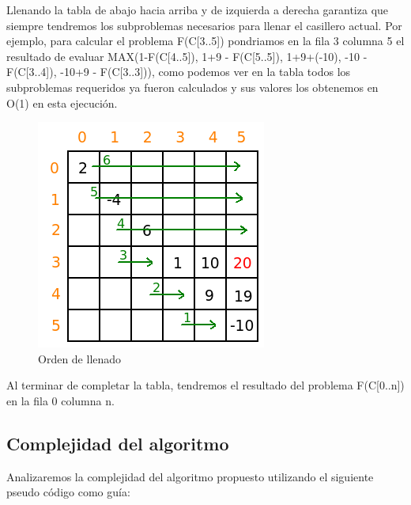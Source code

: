 Llenando la tabla de abajo hacia arriba y de izquierda a derecha garantiza que siempre tendremos los subproblemas necesarios para llenar el casillero actual. Por ejemplo, para calcular el problema F(C[3..5]) pondriamos en la fila 3 columna 5 el resultado de evaluar MAX(1-F(C[4..5]), 1+9 - F(C[5..5]), 1+9+(-10), -10 - F(C[3..4]), -10+9 - F(C[3..3])), como podemos ver en la tabla todos los subproblemas requeridos ya fueron calculados y sus valores los obtenemos en O(1) en esta ejecuci\'on.

\begin{figure}[h]
\begin{center}
\includegraphics[scale=0.6]{./img/ej1_res4.png}
\caption{Orden de llenado}
\end{center}
\end{figure}

Al terminar de completar la tabla, tendremos el resultado del problema F(C[0..n]) en la fila 0 columna n.

\newpage 

\subsection{Complejidad del algoritmo}

Analizaremos la complejidad del algoritmo propuesto utilizando el siguiente pseudo c\'odigo como gu\'ia: \\

